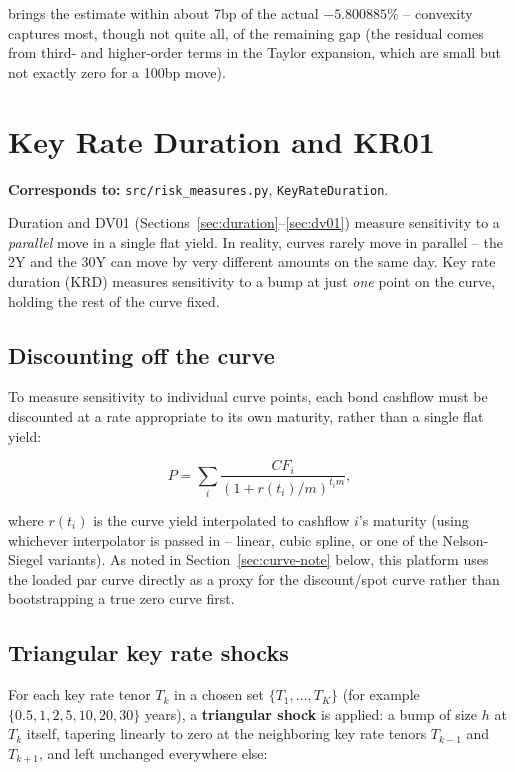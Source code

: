 \documentclass[11pt]{article}
\begin{document}
brings the estimate within about 7bp of the actual $-5.800885\%$ -- convexity captures most,
though not quite all, of the remaining gap (the residual comes from third- and higher-order
terms in the Taylor expansion, which are small but not exactly zero for a 100bp move).

\section{Key Rate Duration and KR01}
\label{sec:krd}

\textbf{Corresponds to:} \texttt{src/risk\_measures.py}, \texttt{KeyRateDuration}.

Duration and DV01 (Sections~\ref{sec:duration}--\ref{sec:dv01}) measure sensitivity to a
\emph{parallel} move in a single flat yield. In reality, curves rarely move in parallel --
the 2Y and the 30Y can move by very different amounts on the same day. Key rate duration (KRD)
measures sensitivity to a bump at just \emph{one} point on the curve, holding the rest of the
curve fixed.

\subsection{Discounting off the curve}

To measure sensitivity to individual curve points, each bond cashflow must be discounted at a
rate appropriate to its own maturity, rather than a single flat yield:

\begin{equation}
  P = \sum_i \frac{CF_i}{(1+r(t_i)/m)^{t_i m}},
  \label{eq:curve-pricing}
\end{equation}

where $r(t_i)$ is the curve yield interpolated to cashflow $i$'s maturity (using whichever
interpolator is passed in -- linear, cubic spline, or one of the Nelson-Siegel variants). As
noted in Section~\ref{sec:curve-note} below, this platform uses the loaded par curve directly
as a proxy for the discount/spot curve rather than bootstrapping a true zero curve first.

\subsection{Triangular key rate shocks}

For each key rate tenor $T_k$ in a chosen set $\{T_1, \dots, T_K\}$ (for example
$\{0.5, 1, 2, 5, 10, 20, 30\}$ years), a \textbf{triangular shock} is applied: a bump of size
$h$ at $T_k$ itself, tapering linearly to zero at the neighboring key rate tenors $T_{k-1}$ and
$T_{k+1}$, and left unchanged everywhere else:
\end{document}
